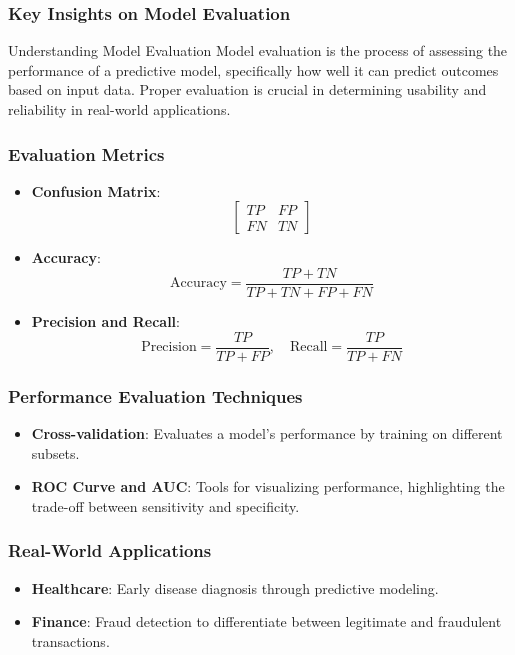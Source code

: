 \documentclass[aspectratio=169]{beamer}
\begin{document}
\begin{frame}[fragile]
    \frametitle{Key Insights on Model Evaluation}
    \begin{block}{Understanding Model Evaluation}
        Model evaluation is the process of assessing the performance of a predictive model, specifically how well it can predict outcomes based on input data. Proper evaluation is crucial in determining usability and reliability in real-world applications.
    \end{block}
\end{frame}

\begin{frame}[fragile]
    \frametitle{Evaluation Metrics}
    \begin{itemize}
        \item \textbf{Confusion Matrix}: 
        \[
        \begin{bmatrix}
        TP & FP \\
        FN & TN
        \end{bmatrix}
        \]
        
        \item \textbf{Accuracy}: 
        \[
        \text{Accuracy} = \frac{TP + TN}{TP + TN + FP + FN}
        \]

        \item \textbf{Precision and Recall}: 
        \[
        \text{Precision} = \frac{TP}{TP + FP}, \quad \text{Recall} = \frac{TP}{TP + FN}
        \]
    \end{itemize}
\end{frame}

\begin{frame}[fragile]
    \frametitle{Performance Evaluation Techniques}
    \begin{itemize}
        \item \textbf{Cross-validation}: Evaluates a model’s performance by training on different subsets.
        \item \textbf{ROC Curve and AUC}: Tools for visualizing performance, highlighting the trade-off between sensitivity and specificity.
    \end{itemize}
\end{frame}

\begin{frame}[fragile]
    \frametitle{Real-World Applications}
    \begin{itemize}
        \item \textbf{Healthcare}: Early disease diagnosis through predictive modeling.
        \item \textbf{Finance}: Fraud detection to differentiate between legitimate and fraudulent transactions.
    \end{itemize}
\end{frame}
\end{document}
